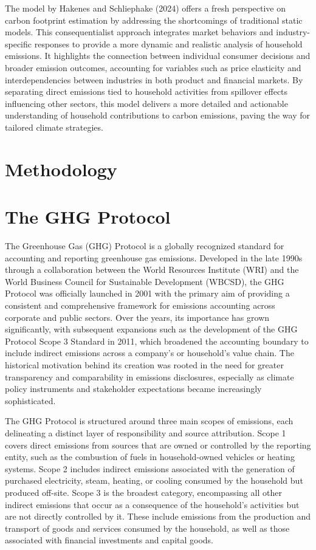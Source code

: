 \documentclass[12pt,a4paper]{article}%
\begin{document}
The model by Hakenes and Schliephake (2024) offers a fresh perspective on carbon footprint estimation by addressing the shortcomings of traditional static models. This consequentialist approach integrates market behaviors and industry-specific responses to provide a more dynamic and realistic analysis of household emissions. It highlights the connection between individual consumer decisions and broader emission outcomes, accounting for variables such as price elasticity and interdependencies between industries in both product and financial markets. By separating direct emissions tied to household activities from spillover effects influencing other sectors, this model delivers a more detailed and actionable understanding of household contributions to carbon emissions, paving the way for tailored climate strategies.


\section{Methodology}
\lipsum[3-4]

\section{The GHG Protocol}
The Greenhouse Gas (GHG) Protocol is a globally recognized standard for accounting and reporting greenhouse gas emissions. Developed in the late 1990s through a collaboration between the World Resources Institute (WRI) and the World Business Council for Sustainable Development (WBCSD), the GHG Protocol was officially launched in 2001 with the primary aim of providing a consistent and comprehensive framework for emissions accounting across corporate and public sectors. Over the years, its importance has grown significantly, with subsequent expansions such as the development of the GHG Protocol Scope 3 Standard in 2011, which broadened the accounting boundary to include indirect emissions across a company’s or household’s value chain. The historical motivation behind its creation was rooted in the need for greater transparency and comparability in emissions disclosures, especially as climate policy instruments and stakeholder expectations became increasingly sophisticated.

The GHG Protocol is structured around three main scopes of emissions, each delineating a distinct layer of responsibility and source attribution. Scope 1 covers direct emissions from sources that are owned or controlled by the reporting entity, such as the combustion of fuels in household-owned vehicles or heating systems. Scope 2 includes indirect emissions associated with the generation of purchased electricity, steam, heating, or cooling consumed by the household but produced off-site. Scope 3 is the broadest category, encompassing all other indirect emissions that occur as a consequence of the household’s activities but are not directly controlled by it. These include emissions from the production and transport of goods and services consumed by the household, as well as those associated with financial investments and capital goods.
\end{document}

